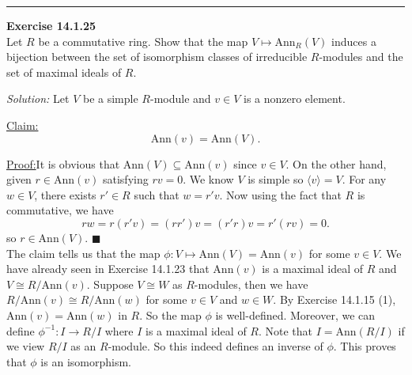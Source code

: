 \documentclass[a4paper, 12pt]{article}
\newenvironment{problem}[2][Exercise]
    { \begin{mdframed}[backgroundcolor=gray!20] \textbf{#1 #2} \\}
    {  \end{mdframed}}
\newenvironment{solution}
    {\textit{Solution:}}
    {}
\newenvironment{claim}[1]{\par\noindent\underline{Claim:}\space#1}{}
\newenvironment{claimproof}[1]{\par\noindent\underline{Proof:}\space#1}{\hfill $\blacksquare$}
\newcommand{\la}{\langle}
\newcommand{\ra}{\rangle}
\newcommand{\Ann}{\text{Ann}}
\begin{document}
\noindent\rule{7in}{2.8pt}
\newpage
\begin{problem}{14.1.25}
Let \(R\) be a commutative ring. Show that the map \(V\mapsto \Ann_R(V)\) induces a bijection between the set of isomorphism classes of irreducible \(R\)-modules and 
the set of maximal ideals of \(R\).
\end{problem}
\begin{solution}
Let \(V\) be a simple \(R\)-module and \(v\in V\) is a nonzero element. 

\begin{claim}
\[\Ann(v)=\Ann(V).\]
\end{claim}
\begin{claimproof}
It is obvious that \(\Ann(V)\subseteq \Ann(v)\) since \(v\in V\). On the other hand, given \(r\in \Ann(v)\) satisfying \(rv=0\). We know \(V\) is simple so \(\la v\ra =V\). For any \(w\in V\), there exists 
\(r'\in R\) such that \(w=r'v\). Now using the fact that \(R\) is commutative, we have 
\[rw=r(r'v)=(rr')v=(r'r)v=r'(rv)=0.\]
so \(r\in \Ann(V)\).
\end{claimproof}\\
The claim tells us that the map \(\phi:V\mapsto \Ann(V)=\Ann(v)\) for some \(v\in V\). We have already seen in Exercise 14.1.23 that \(\Ann(v)\) is a maximal ideal of \(R\) and \(V\cong R/\Ann(v)\). Suppose \(V\cong W\) as \(R\)-modules, then we have 
\(R/\Ann(v)\cong R/\Ann(w)\) for some \(v\in V\) and \(w\in W\). By Exercise 14.1.15 (1), \(\Ann(v)=\Ann(w)\) in \(R\). So the map \(\phi\) is well-defined. Moreover, we can define \(\phi^{-1}:I\rightarrow R/I\) where \(I\) is a maximal ideal of \(R\). Note that 
\(I=\Ann(R/I)\) if we view \(R/I\) as an \(R\)-module. So this indeed defines an inverse of \(\phi\). This proves that \(\phi\) is an isomorphism.  
\end{solution}
\end{document}
